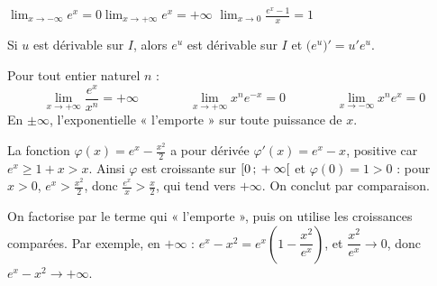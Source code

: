 \par\vspace{3mm}
\noindent
\begin{minipage}[c]{0.4\linewidth}
\centering
\begin{tableau}
\end{tableau}
\end{minipage}\hfill
\begin{minipage}[c]{0.56\linewidth}
\begin{theoreme}
\raggedright
$\displaystyle\lim_{x\to-\infty}e^{x}=0$\qquad $\displaystyle\lim_{x\to+\infty}e^{x}=+\infty$\qquad
$\displaystyle\lim_{x\to0}\frac{e^{x}-1}{x}=1$
\end{theoreme}
\begin{theoreme}[Composée]
\raggedright
Si $u$ est dérivable sur $I$, alors $e^{u}$ est dérivable sur $I$ et $\big(e^{u}\big)'=u'e^{u}$.
\end{theoreme}
\end{minipage}


\begin{theoreme}
Pour tout entier naturel $n$ :
\[ \lim_{x\to+\infty}\frac{e^{x}}{x^{n}}=+\infty \qquad\qquad \lim_{x\to+\infty}x^{n}e^{-x}=0 \qquad\qquad \lim_{x\to-\infty}x^{n}e^{x}=0 \]
En $\pm\infty$, l'exponentielle « l'emporte » sur toute puissance de $x$.
\end{theoreme}

\begin{demonstration}[pour $n=1$]
La fonction $\varphi(x)=e^{x}-\frac{x^{2}}{2}$ a pour dérivée $\varphi'(x)=e^{x}-x$, positive car $e^{x}\geq1+x>x$. Ainsi $\varphi$
est croissante sur $\mathopen{[}0\,{;}\,+\infty\mathclose{[}$ et $\varphi(0)=1>0$ : pour $x>0$, $e^{x}>\frac{x^{2}}{2}$, donc $\frac{e^{x}}{x}>\frac x2$, qui
tend vers $+\infty$. On conclut par comparaison.
\end{demonstration}

\begin{savoirfaire}
On factorise par le terme qui « l'emporte », puis on utilise les croissances comparées. Par exemple, en $+\infty$ :
$e^{x}-x^{2}=e^{x}\left(1-\dfrac{x^{2}}{e^{x}}\right)$, et $\dfrac{x^{2}}{e^{x}}\to0$, donc $e^{x}-x^{2}\to+\infty$.
\end{savoirfaire}

